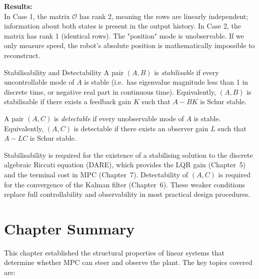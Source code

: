 \textbf{Results:}\\

In Case 1, the matrix $\mathcal{O}$ has rank 2, meaning the rows are linearly independent; information about both states is present in the output history. In Case 2, the matrix has rank 1 (identical rows). The "position" mode is unobservable. If we only measure speed, the robot's absolute position is mathematically impossible to reconstruct.

\begin{defnbox}{Stabilisability and Detectability}
A pair $(A, B)$ is \emph{stabilisable} if every uncontrollable mode of $A$ is stable (i.e.\ has eigenvalue magnitude less than 1 in discrete time, or negative real part in continuous time). Equivalently, $(A, B)$ is stabilisable if there exists a feedback gain $K$ such that $A - BK$ is Schur stable.

A pair $(A, C)$ is \emph{detectable} if every unobservable mode of $A$ is stable. Equivalently, $(A, C)$ is detectable if there exists an observer gain $L$ such that $A - LC$ is Schur stable.
\end{defnbox}

Stabilisability is required for the existence of a stabilising solution to the discrete algebraic Riccati equation (DARE), which provides the LQR gain (Chapter~5) and the terminal cost in MPC (Chapter~7). Detectability of $(A, C)$ is required for the convergence of the Kalman filter (Chapter~6). These weaker conditions replace full controllability and observability in most practical design procedures.

\section{Chapter Summary}

This chapter established the structural properties of linear systems that determine whether MPC can steer and observe the plant. The key topics covered are:

